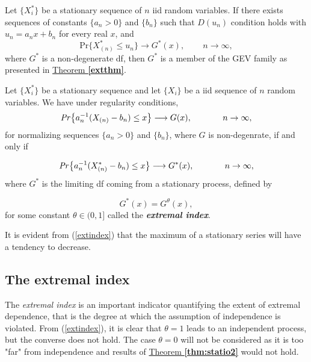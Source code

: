 \begin{theorem}
	Let $\{X^*_i\}$ be a stationary sequence of $n$ iid random variables. If there exists sequences of constants $\{a_n>0\}$ and $\{b_n\}$ such that $D(u_n)$ condition holds with $u_n=a_nx+b_n$ for every real $x$, and	
	\begin{equation}
	\text{Pr}\{X^*_{(n)}\leq u_n\}\longrightarrow G^*(x), \ \ \ \ \ \ \ \, \ \ n\rightarrow\infty,
	\end{equation}
	where $G^*$ is a non-degenerate df, then $G^*$ is a member of the GEV family as presented in \hyperref[extthm]{Theorem \textbf{\ref{extthm}}}.
	
\end{theorem}


\begin{theorem}\label{thm:statio2}
	Let $\{X^*_i\}$ be a stationary sequence and let $\{X_i\}$ be a iid sequence of $n$ random variables. We have under regularity conditions, 
	\begin{equation*}
	\text{\emph{Pr}}\big\{a_n^{-1}(X_{(n)}-b_n)\leq x\big\}\longrightarrow G(x), \ \ \ \ \ \ \ \ \ \ \ n\rightarrow \infty,
	\end{equation*}
	for normalizing sequences $\{a_n>0\}$ and $\{b_n\}$, where $G$ is non-degenrate, if and only if 
	
	\begin{equation*}\label{extremindex}
	\text{\emph{Pr}}\big\{a_n^{-1}(X^*_{(n)}-b_n)\leq x \big\}\longrightarrow G^*(x), \ \ \ \ \ \ \ \ \ \ \  n\rightarrow\infty,
	\end{equation*}
	where $G^*$ is the limiting df coming from a stationary process, defined by
	
	\begin{equation}\label{extindex}
	G^*(x)=G^{\theta}(x),
	\end{equation}
	for some constant $\theta\in (0,1]$ called the \emph{\textbf{extremal index}}.
	
\end{theorem}
It is evident from (\ref{extindex}) that the maximum of a stationary series will have a tendency to decrease.

\subsection{The extremal index}
The \emph{extremal index} is an important indicator quantifying the extent of extremal dependence, that is the degree at which the assumption of independence is violated. From (\ref{extindex}), it is clear that $\theta=1$ leads to an independent process, but the converse does not hold. The case $\theta= 0$ will not be considered as it is too "far" from independence and results of \hyperref[thm:statio2]{Theorem \textbf{\ref{thm:statio2}}} would not hold.

